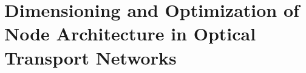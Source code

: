 
\chapter{Dimensioning and Optimization of Node Architecture in Optical Transport Networks}









